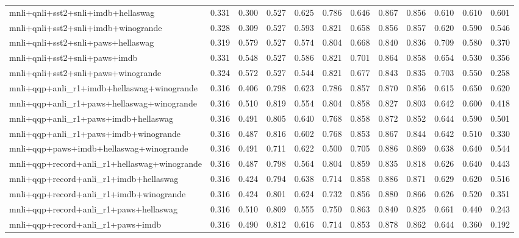 \begin{table}[t]
\begin{tabular}{lrrrrrrrrrrr}
    mnli+qnli+sst2+snli+imdb+hellaswag & 0.331 & 0.300 & 0.527 & 0.625 & 0.786 & 0.646 & 0.867 & 0.856 & 0.610 & 0.610 & 0.601 \\
    mnli+qnli+sst2+snli+imdb+winogrande & 0.328 & 0.309 & 0.527 & 0.593 & 0.821 & 0.658 & 0.856 & 0.857 & 0.620 & 0.590 & 0.546 \\
    mnli+qnli+sst2+snli+paws+hellaswag & 0.319 & 0.579 & 0.527 & 0.574 & 0.804 & 0.668 & 0.840 & 0.836 & 0.709 & 0.580 & 0.370 \\
    mnli+qnli+sst2+snli+paws+imdb & 0.331 & 0.548 & 0.527 & 0.586 & 0.821 & 0.701 & 0.864 & 0.858 & 0.654 & 0.530 & 0.356 \\
    mnli+qnli+sst2+snli+paws+winogrande & 0.324 & 0.572 & 0.527 & 0.544 & 0.821 & 0.677 & 0.843 & 0.835 & 0.703 & 0.550 & 0.258 \\
    mnli+qqp+anli\_r1+imdb+hellaswag+winogrande & 0.316 & 0.406 & 0.798 & 0.623 & 0.786 & 0.857 & 0.870 & 0.856 & 0.615 & 0.650 & 0.620 \\
    mnli+qqp+anli\_r1+paws+hellaswag+winogrande & 0.316 & 0.510 & 0.819 & 0.554 & 0.804 & 0.858 & 0.827 & 0.803 & 0.642 & 0.600 & 0.418 \\
    mnli+qqp+anli\_r1+paws+imdb+hellaswag & 0.316 & 0.491 & 0.805 & 0.640 & 0.768 & 0.858 & 0.872 & 0.852 & 0.644 & 0.590 & 0.501 \\
    mnli+qqp+anli\_r1+paws+imdb+winogrande & 0.316 & 0.487 & 0.816 & 0.602 & 0.768 & 0.853 & 0.867 & 0.844 & 0.642 & 0.510 & 0.330 \\
    mnli+qqp+paws+imdb+hellaswag+winogrande & 0.316 & 0.491 & 0.711 & 0.622 & 0.500 & 0.705 & 0.886 & 0.869 & 0.638 & 0.640 & 0.544 \\
    mnli+qqp+record+anli\_r1+hellaswag+winogrande & 0.316 & 0.487 & 0.798 & 0.564 & 0.804 & 0.859 & 0.835 & 0.818 & 0.626 & 0.640 & 0.443 \\
    mnli+qqp+record+anli\_r1+imdb+hellaswag & 0.316 & 0.424 & 0.794 & 0.638 & 0.714 & 0.858 & 0.886 & 0.871 & 0.629 & 0.620 & 0.516 \\
    mnli+qqp+record+anli\_r1+imdb+winogrande & 0.316 & 0.424 & 0.801 & 0.624 & 0.732 & 0.856 & 0.880 & 0.866 & 0.626 & 0.520 & 0.351 \\
    mnli+qqp+record+anli\_r1+paws+hellaswag & 0.316 & 0.510 & 0.809 & 0.555 & 0.750 & 0.863 & 0.840 & 0.825 & 0.661 & 0.440 & 0.243 \\
    mnli+qqp+record+anli\_r1+paws+imdb & 0.316 & 0.490 & 0.812 & 0.616 & 0.714 & 0.853 & 0.878 & 0.862 & 0.644 & 0.360 & 0.192 \\

\end{tabular}
\end{table}

